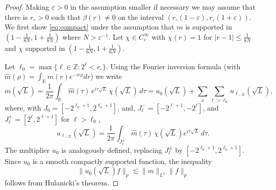 \documentclass[leqno]{amsart}
\theoremstyle{definition}
\theoremstyle{remark}
\numberwithin{equation}{section}
\newcommand{\R}{\mathbb{R}}
\newcommand{\Z}{\mathbb{Z}}
\renewcommand{\hat}{\widehat}
\newcommand{\eps}{\varepsilon}
\newcommand\lc{\lesssim}
\newcommand\Coi{{C^\infty_{\mathrm c}}}
\begin{document}
\begin{proof} 
Making $\eps>0$ in the assumption smaller if necessary we may assume that 
there is $r_\circ>0$ 
such that $\beta(r)\neq 0$ on the  interval $(r_\circ(1-\eps), r_\circ(1+\eps) )$. We first show \eqref{eq:compact} under the assumption
that $m$ is supported in $(1-\frac{1}{8N}, 1+\frac{1}{8N})$ where $N>\eps^{-1}$. Let $\chi\in \Coi$ with $\chi(r)=1$ for $|r-1|\le \frac{1}{8N}$ and $\chi$ supported in $(1-\frac{1}{6N}, 1+\frac{1}{6N})$. 

Let $\ell_0=\max\{\ell \in \Z: 2^\ell < r_\circ\}$.
Using the Fourier inversion formula (with $\widehat m(\rho) =\int_\R m(r)e^{-ir\rho} dr$) we write 
\[ m(\sqrt{L}) 
 = \frac 1{2\pi} \int_\R \, \hat{m}(\tau ) \, e^{i\tau  \sqrt{L}} \, \chi(\sqrt{L}) \, {d\tau  } = u_0(\sqrt L)+\sum_\pm \sum_{\ell > \ell_0} u_{\ell,\pm}  (\sqrt L), \]
  where, with $J_0 = [-2^{\ell_0+1}, 2^{\ell_0+1}]$, and,  $J_\ell^- = [-2^{\ell + 1}, -2^\ell] $, and 
  $J_\ell^+=  [2^\ell, 2^{\ell + 1}]$ for $\ell>\ell_0$, 
 \[ u_{\ell,\pm}  (\sqrt L)= \frac{1}{2\pi}
\int_{J_{\ell}^{ \pm } }\hat{m}(\tau ) \, \chi(\sqrt{L}) e^{i\tau \sqrt{L}} \, {d\tau } . 
\] The multiplier $u_0$ is analogously defined, replacing $J_\ell^\pm$ by $[-2^{\ell_0+1},2^{\ell_0+1}]$. Since $u_0$ is a smooth compactly supported function, the inequality
\[
\|u_0(\sqrt L) f\|_p\lc \|m\|_{L^2} \|f\|_p
\]
follows from Hulanicki's theorem. 


\end{proof}
\end{document}
